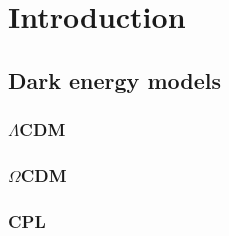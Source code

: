 \section{Introduction}
\subsection{Dark energy models}
\subsubsection{$\Lambda$CDM}
\subsubsection{$\Omega$CDM}
\subsubsection{CPL}